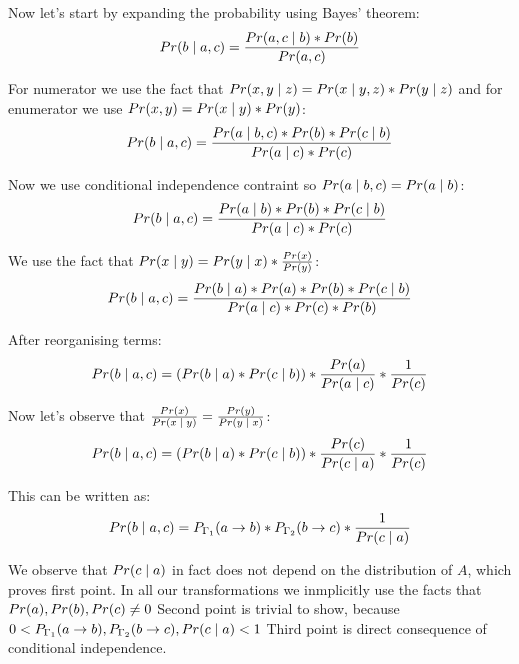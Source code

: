 Now let's start by expanding the probability using Bayes' theorem:
\begin{equation}
\prob{b}[a,c] = \frac{ \prob{a,c}[b]*\prob{b} }{ \prob{a,c} }
\end{equation}

For numerator we use the fact that $\prob{x,y}[z] = \prob{x}[y,z]*\prob{y}[z]$ and for enumerator we use $\prob{x,y}=\prob{x}[y]*\prob{y}$:
\begin{equation}
\prob{b}[a,c] = \frac{ \prob{a}[b,c]*\prob{b}*\prob{c}[b] }{ \prob{a}[c] * \prob{c} }
\end{equation}

Now we use conditional independence contraint so $\prob{a}[b,c] = \prob{a}[b]$:
\begin{equation}
\prob{b}[a,c] = \frac{ \prob{a}[b]*\prob{b}*\prob{c}[b] }{ \prob{a}[c] * \prob{c} }
\end{equation}

We use the fact that $\prob{x}[y] = \prob{y}[x] * \frac{\prob{x}}{\prob{y}}$:
\begin{equation}
\prob{b}[a,c] = \frac{ \prob{b}[a]*\prob{a}*\prob{b}*\prob{c}[b] }{ \prob{a}[c] * \prob{c} * \prob{b} }
\end{equation}

After reorganising terms:
\begin{equation}
\prob{b}[a,c] = (\prob{b}[a] * \prob{c}[b]) * \frac{ \prob{a} }{ \prob{a}[c] } * \frac{1}{\prob{c}}
\end{equation}

Now let's observe that $\frac{\prob{x}}{\prob{x}[y]} = \frac{\prob{y}}{\prob{y}[x]}$:
\begin{equation}
\prob{b}[a,c] = (\prob{b}[a] * \prob{c}[b]) * \frac{ \prob{c} }{ \prob{c}[a] } * \frac{1}{\prob{c}}
\end{equation}

This can be written as:
\begin{equation}
\prob{b}[a,c] = \prtf{\Gamma_1}{a}{b} * \prtf{\Gamma_2}{b}{c} * \frac{ 1 }{ \prob{c}[a] }
\end{equation}

We observe that $\prob{c}[a]$ in fact does not depend on the distribution of $A$, which proves first point.
In all our transformations we inmplicitly use the facts that $\prob{a}, \prob{b}, \prob{c} \neq 0$
Second point is trivial to show, because $0 < \prtf{\Gamma_1}{a}{b}, \prtf{\Gamma_2}{b}{c}, \prob{c}[a] < 1$
Third point is direct consequence of conditional independence.


